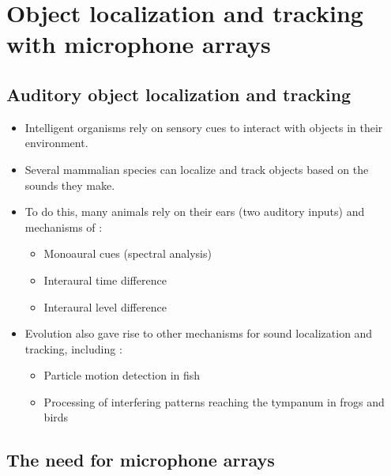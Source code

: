 \documentclass[14pt, oneside]{extarticle}
\begin{document}
\section{Object localization and tracking with microphone arrays}

\subsection{Auditory object localization and tracking}

\begin{itemize}

\item Intelligent organisms rely on sensory cues to interact with objects in their environment. 

\item Several mammalian species can localize and track objects based on the sounds they make.

\item To do this, many animals rely on their ears (two auditory inputs) and mechanisms of \cite{grothe2010mechanisms}:
	\begin{itemize}
	\item Monoaural cues (spectral analysis)
	\item Interaural time difference
	\item Interaural level difference
	\end{itemize}

\item Evolution also gave rise to other mechanisms for sound localization and tracking, including \cite{grothe2010mechanisms}: 
	\begin{itemize}
	\item Particle motion detection in fish 
	\item Processing of interfering patterns reaching the tympanum in frogs and birds
	\end{itemize}

\end{itemize}

\subsection{The need for microphone arrays}
\end{document}
